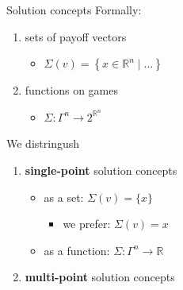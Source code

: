 \documentclass{beamer}
\newcommand{\Rn}[1][n]{\mathbb{R}^{#1}}
\begin{document}
\begin{frame}{Solution concepts}
    Formally:
	\begin{enumerate}
	    \item sets of payoff vectors
	    \begin{itemize}
	        \item $\Sigma(v) = \left\{x \in \Rn \mid \dots\right\}$
	    \end{itemize}
	    \item functions on games
	    \begin{itemize}
	        \item $\Sigma \colon \Gamma^n \to 2^{\Rn}$
	    \end{itemize}
	\end{enumerate}
	We distringush
	\begin{enumerate}
	    \item<2-> \textbf{single-point} solution concepts
	    \begin{itemize}
	        \item<3-> as a set: $\Sigma(v) = \{x\}$ 
	        \begin{itemize}
	            \item<3-> we prefer: $\Sigma(v) = x$
	        \end{itemize}
	        \item<4-> as a function: $\Sigma \colon \Gamma^n \to \mathbb{R}$
	    \end{itemize}
	    \item<2-> \textbf{multi-point} solution concepts
	\end{enumerate}
\end{frame}


\end{document}
